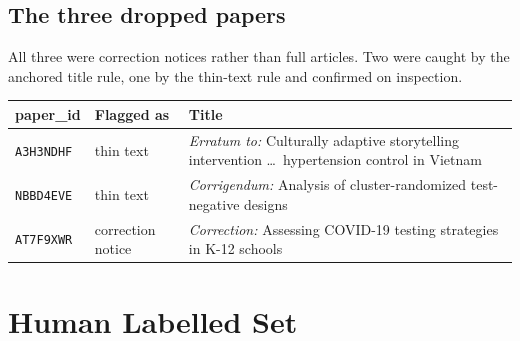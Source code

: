 \documentclass[11pt]{article}
\begin{document}
\subsection*{The three dropped papers}

All three were correction notices rather than full articles. Two were caught by the anchored
title rule, one by the thin-text rule and confirmed on inspection.

\begin{table}[h]
\centering
\begin{tabular}{llp{7.2cm}}
\toprule
\textbf{paper\_id} & \textbf{Flagged as} & \textbf{Title} \\
\midrule
\texttt{A3H3NDHF} & thin text & \emph{Erratum to:} Culturally adaptive storytelling intervention \dots\ hypertension control in Vietnam \\
\texttt{NBBD4EVE} & thin text & \emph{Corrigendum:} Analysis of cluster-randomized test-negative designs \\
\texttt{AT7F9XWR} & correction notice & \emph{Correction:} Assessing COVID-19 testing strategies in K-12 schools \\
\bottomrule
\end{tabular}
\end{table}

\section{Human Labelled Set}
\end{document}
